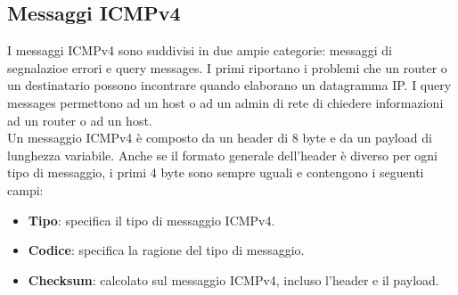 \documentclass[12pt]{report}
\begin{document}
\subsection{Messaggi ICMPv4}
I messaggi ICMPv4 sono suddivisi in due ampie categorie: messaggi di segnalazioe errori e query messages. I primi riportano i problemi che un router o un destinatario possono incontrare quando elaborano un datagramma IP. I query messages permettono ad un host o ad un admin di rete di chiedere informazioni ad un router o ad un host.
\vspace{\baselineskip}\\
Un messaggio ICMPv4 è composto da un header di 8 byte e da un payload di lunghezza variabile. Anche se il formato generale dell'header è diverso per ogni tipo di messaggio, i primi 4 byte sono sempre uguali e contengono i seguenti campi:
\begin{itemize}
	\item \textbf{Tipo}: specifica il tipo di messaggio ICMPv4.
	\item \textbf{Codice}: specifica la ragione del tipo di messaggio.
	\item \textbf{Checksum}: calcolato sul messaggio ICMPv4, incluso l'header e il payload.
\end{itemize}
\end{document}
